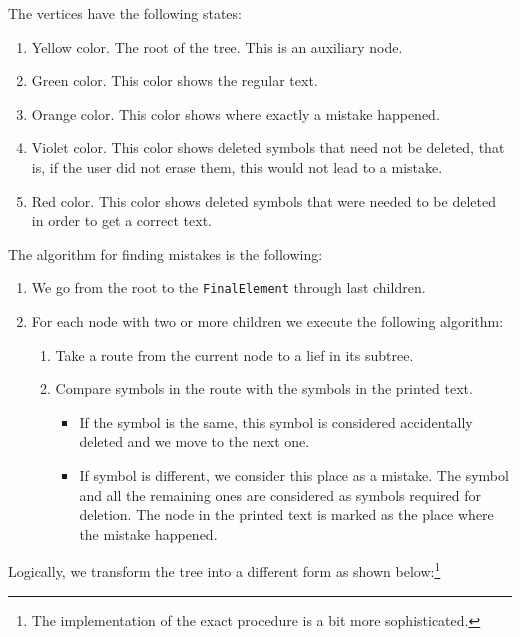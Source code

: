 \documentclass{article}
\begin{document}
The vertices have the following states:
\begin{enumerate}
\item Yellow color. The root of the tree. This is an auxiliary node.
\item Green color. This color shows the regular text.
\item Orange color. This color shows where exactly a mistake happened.
\item Violet color. This color shows deleted symbols that need not be deleted, that is, if the user did not erase them, this would not lead to a mistake.
\item Red color. This color shows deleted symbols that were needed to be deleted in order to get a correct text.
\end{enumerate}
The algorithm for finding mistakes is the following:
\begin{enumerate}
\item We go from the root to the \verb"FinalElement" through last children.
\item For each node with two or more children we execute the following algorithm:
\begin{enumerate}
\item Take a route from the current node to a lief in its subtree.
\item Compare symbols in the route with the symbols in the printed text. 
\begin{itemize}
\item If the symbol is the same, this symbol is considered accidentally deleted and we move to the next one.
\item If symbol is different, we consider this place as a mistake. The symbol and all the remaining ones are considered as symbols required for deletion. The node in the printed text is marked as the place where the mistake happened.
\end{itemize}
\end{enumerate}
\end{enumerate}
Logically, we transform the tree into a different form as shown below:\footnote{The implementation of the exact procedure is a bit more sophisticated.}
\end{document}
